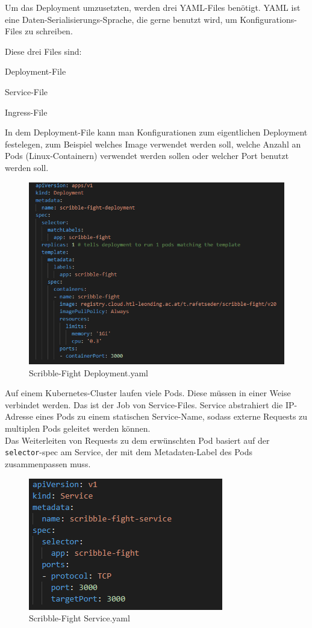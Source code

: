 Um das Deployment umzusetzten, werden drei YAML-Files benötigt. 
YAML ist eine Daten-Serialisierungs-Sprache, die gerne benutzt wird, um Konfigurations-Files zu schreiben.

Diese drei Files sind:
\begin{compactitem}
    \item Deployment-File
    \item Service-File
    \item Ingress-File
\end{compactitem}

In dem Deployment-File kann man Konfigurationen zum eigentlichen Deployment festelegen, zum Beispiel welches Image verwendet werden soll,
welche Anzahl an Pods (Linux-Containern) verwendet werden sollen oder welcher Port benutzt werden soll. 

\begin{figure}[H]
    \centering
    \includegraphics[scale=0.85]{pics/deployment.PNG}
    \caption{Scribble-Fight Deployment.yaml}
\end{figure}

Auf einem Kubernetes-Cluster laufen viele Pods. Diese müssen in einer Weise verbindet werden. Das ist der Job von Service-Files.
Service abstrahiert die IP-Adresse eines Pods zu einem statischen Service-Name, sodass externe Requests zu multiplen Pods geleitet werden können.
\\
Das Weiterleiten von Requests zu dem erwünschten Pod basiert auf der \texttt{selector}-spec am Service, der mit dem Metadaten-Label des Pods zusammenpassen muss. 

\begin{figure}[H]
    \centering
    \includegraphics[scale=1]{pics/service.PNG}
    \caption{Scribble-Fight Service.yaml}
\end{figure}

